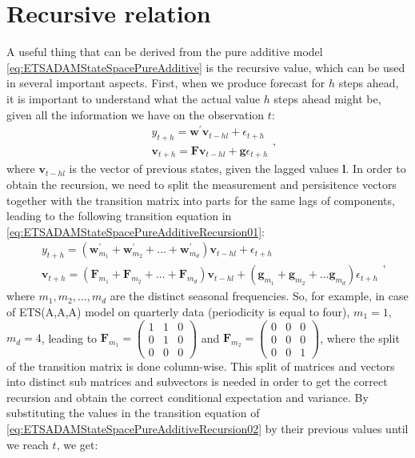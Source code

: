 \documentclass[
]{book}
\theoremstyle{definition}
\theoremstyle{definition}
\theoremstyle{definition}
\theoremstyle{definition}
\theoremstyle{remark}
\begin{document}
\hypertarget{adamETSPureAdditiveRecursive}{%
\section{Recursive relation}\label{adamETSPureAdditiveRecursive}}

A useful thing that can be derived from the pure additive model \eqref{eq:ETSADAMStateSpacePureAdditive} is the recursive value, which can be used in several important aspects. First, when we produce forecast for \(h\) steps ahead, it is important to understand what the actual value \(h\) steps ahead might be, given all the information we have on the observation \(t\):
\begin{equation}
  \begin{aligned}
    & {y}_{t+h} = \mathbf{w}^\prime \mathbf{v}_{t-h{l}} + \epsilon_{t+h} \\
    & \mathbf{v}_{t+h} = \mathbf{F} \mathbf{v}_{t-h{l}} + \mathbf{g} \epsilon_{t+h}
  \end{aligned},
  \label{eq:ETSADAMStateSpacePureAdditiveRecursion01}
\end{equation}
where \(\mathbf{v}_{t-h{l}}\) is the vector of previous states, given the lagged values \(\boldsymbol{l}\). In order to obtain the recursion, we need to split the measurement and persisitence vectors together with the transition matrix into parts for the same lags of components, leading to the following transition equation in \eqref{eq:ETSADAMStateSpacePureAdditiveRecursion01}:
\begin{equation}
  \begin{aligned}
    & {y}_{t+h} = (\mathbf{w}_{m_1}^\prime + \mathbf{w}_{m_2}^\prime + \dots + \mathbf{w}_{m_d}^\prime) \mathbf{v}_{t-h{l}} + \epsilon_{t+h} \\
    & \mathbf{v}_{t+h} = (\mathbf{F}_{m_1} + \mathbf{F}_{m_2} + \dots + \mathbf{F}_{m_d}) \mathbf{v}_{t-h{l}} + (\mathbf{g}_{m_1} + \mathbf{g}_{m_2} + \dots \mathbf{g}_{m_d}) \epsilon_{t+h}
  \end{aligned},
  \label{eq:ETSADAMStateSpacePureAdditiveRecursion02}
\end{equation}
where \(m_1, m_2, \dots, m_d\) are the distinct seasonal frequencies. So, for example, in case of ETS(A,A,A) model on quarterly data (periodicity is equal to four), \(m_1=1\), \(m_d=4\), leading to \(\mathbf{F}_{m_1} = \begin{pmatrix} 1 & 1 & 0 \\ 0 & 1 & 0 \\ 0 & 0 & 0 \end{pmatrix}\) and \(\mathbf{F}_{m_2} = \begin{pmatrix} 0 & 0 & 0 \\ 0 & 0 & 0 \\ 0 & 0 & 1 \end{pmatrix}\), where the split of the transition matrix is done column-wise. This split of matrices and vectors into distinct sub matrices and subvectors is needed in order to get the correct recursion and obtain the correct conditional expectation and variance. By substituting the values in the transition equation of \eqref{eq:ETSADAMStateSpacePureAdditiveRecursion02} by their previous values until we reach \(t\), we get:
\end{document}
